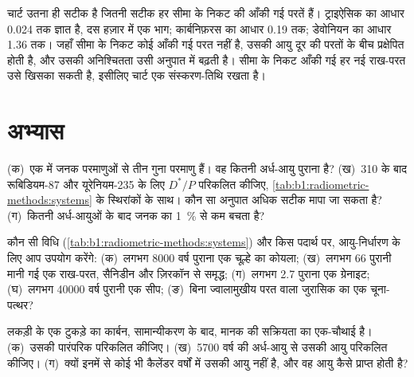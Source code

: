 चार्ट उतना ही सटीक है जितनी सटीक हर सीमा के निकट की आँकी गई परतें हैं। ट्राइऐसिक का आधार \qty{0.024}{\Myr} तक ज्ञात है, दस हज़ार में एक भाग; कार्बनिफ़रस का आधार \qty{0.19}{\Myr} तक; डेवोनियन का आधार \qty{1.36}{\Myr} तक। जहाँ सीमा के निकट कोई आँकी गई परत नहीं है, उसकी आयु दूर की परतों के बीच प्रक्षेपित होती है, और उसकी अनिश्चितता उसी अनुपात में बढ़ती है। सीमा के निकट आँकी गई हर नई राख-परत उसे खिसका सकती है, इसीलिए चार्ट एक संस्करण-तिथि रखता है।

\section{अभ्यास}

\begin{exercise}[$\star$]\label{exo:b1:radiometric-methods:1}
(क)~एक  में जनक परमाणुओं से तीन गुना  परमाणु हैं। वह कितनी अर्ध-आयु पुराना है? (ख)~\qty{310}{\Myr} के बाद रूबिडियम-87 और यूरेनियम-235 के लिए $D^*/P$ परिकलित कीजिए, \cref{tab:b1:radiometric-methods:systems} के स्थिरांकों के साथ। कौन सा अनुपात अधिक सटीक मापा जा सकता है? (ग)~कितनी अर्ध-आयुओं के बाद जनक का \qty{1}{\percent} से कम बचता है?
\end{exercise}

\begin{exercise}[$\star$]\label{exo:b1:radiometric-methods:2}
कौन सी विधि (\cref{tab:b1:radiometric-methods:systems}) और किस पदार्थ पर, आयु-निर्धारण के लिए आप उपयोग करेंगे: (क)~लगभग \num{8000} वर्ष पुराना एक चूल्हे का कोयला; (ख)~लगभग \qty{66}{\Ma} पुरानी मानी गई एक राख-परत, सैनिडीन और ज़िरकॉन से समृद्ध; (ग)~लगभग \qty{2.7}{\Ga} पुराना एक ग्रेनाइट; (घ)~लगभग \num{40000} वर्ष पुरानी एक सीप; (ङ)~बिना ज्वालामुखीय परत वाला जुरासिक का एक चूना-पत्थर?
\end{exercise}

\begin{exercise}[$\star$]\label{exo:b1:radiometric-methods:3}
लकड़ी के एक टुकड़े का कार्बन, सामान्यीकरण के बाद, मानक की सक्रियता का एक-चौथाई है। (क)~उसकी पारंपरिक  परिकलित कीजिए। (ख)~\num{5700} वर्ष की अर्ध-आयु से उसकी आयु परिकलित कीजिए। (ग)~क्यों इनमें से कोई भी कैलेंडर वर्षों में उसकी आयु नहीं है, और वह आयु कैसे प्राप्त होती है?
\end{exercise}

